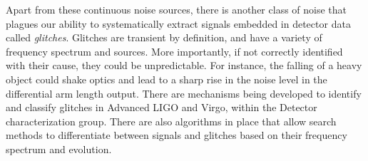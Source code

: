 Apart from these continuous noise sources, there is another class of noise 
that plagues our ability to systematically extract signals embedded in detector
data called {\it glitches}. Glitches are transient by definition, and have a 
variety of frequency spectrum and sources. More importantly, if not correctly 
identified with their cause, they could be unpredictable. For instance, the 
falling of a 
heavy object could shake optics and lead to a sharp rise in the noise level
in the differential arm length output. There are mechanisms being developed to 
identify and classify glitches in Advanced LIGO and Virgo, within the Detector
characterization group. There are also algorithms in place that allow search 
methods to differentiate between signals and glitches based on their frequency
spectrum and evolution.


% 
% 
